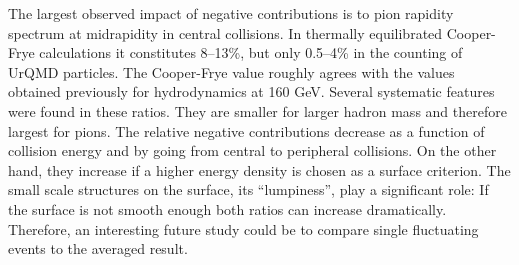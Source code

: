 The largest observed impact of negative contributions is to pion
rapidity spectrum at midrapidity in central collisions. In thermally
equilibrated Cooper-Frye calculations it constitutes 8--13\%, but only
0.5--4\% in the counting of UrQMD particles. The Cooper-Frye value
roughly agrees with the values obtained previously for hydrodynamics
at 160 GeV. Several systematic features were found in these ratios. They
are smaller for larger hadron mass and therefore largest for
pions. The relative negative contributions decrease as a function of
collision energy and by going from central to peripheral
collisions. On the other hand, they increase if a higher energy
density is chosen as a surface criterion. The small scale structures
on the surface, its ``lumpiness'', play a significant role: If the
surface is not smooth enough both ratios can increase
dramatically. Therefore, an interesting future study could be to
compare single fluctuating events to the averaged result.
